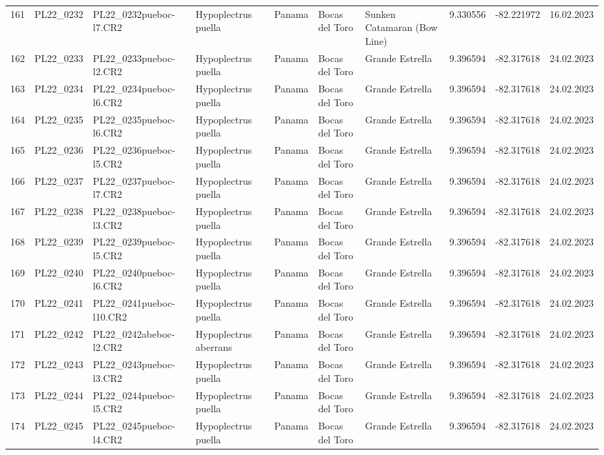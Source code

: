 \begin{table}[ht]
\begin{tabular}{rlllllllll}
  161 & PL22\_0232 & PL22\_0232pueboc-l7.CR2 & Hypoplectrus puella & Panama & Bocas del Toro & Sunken Catamaran (Bow Line) & 9.330556 & -82.221972 & 16.02.2023 \\ 
  162 & PL22\_0233 & PL22\_0233pueboc-l2.CR2 & Hypoplectrus puella & Panama & Bocas del Toro & Grande Estrella & 9.396594 & -82.317618 & 24.02.2023 \\ 
  163 & PL22\_0234 & PL22\_0234pueboc-l6.CR2 & Hypoplectrus puella & Panama & Bocas del Toro & Grande Estrella & 9.396594 & -82.317618 & 24.02.2023 \\ 
  164 & PL22\_0235 & PL22\_0235pueboc-l6.CR2 & Hypoplectrus puella & Panama & Bocas del Toro & Grande Estrella & 9.396594 & -82.317618 & 24.02.2023 \\ 
  165 & PL22\_0236 & PL22\_0236pueboc-l5.CR2 & Hypoplectrus puella & Panama & Bocas del Toro & Grande Estrella & 9.396594 & -82.317618 & 24.02.2023 \\ 
  166 & PL22\_0237 & PL22\_0237pueboc-l7.CR2 & Hypoplectrus puella & Panama & Bocas del Toro & Grande Estrella & 9.396594 & -82.317618 & 24.02.2023 \\ 
  167 & PL22\_0238 & PL22\_0238pueboc-l3.CR2 & Hypoplectrus puella & Panama & Bocas del Toro & Grande Estrella & 9.396594 & -82.317618 & 24.02.2023 \\ 
  168 & PL22\_0239 & PL22\_0239pueboc-l5.CR2 & Hypoplectrus puella & Panama & Bocas del Toro & Grande Estrella & 9.396594 & -82.317618 & 24.02.2023 \\ 
  169 & PL22\_0240 & PL22\_0240pueboc-l6.CR2 & Hypoplectrus puella & Panama & Bocas del Toro & Grande Estrella & 9.396594 & -82.317618 & 24.02.2023 \\ 
  170 & PL22\_0241 & PL22\_0241pueboc-l10.CR2 & Hypoplectrus puella & Panama & Bocas del Toro & Grande Estrella & 9.396594 & -82.317618 & 24.02.2023 \\ 
  171 & PL22\_0242 & PL22\_0242abeboc-l2.CR2 & Hypoplectrus aberrans & Panama & Bocas del Toro & Grande Estrella & 9.396594 & -82.317618 & 24.02.2023 \\ 
  172 & PL22\_0243 & PL22\_0243pueboc-l3.CR2 & Hypoplectrus puella & Panama & Bocas del Toro & Grande Estrella & 9.396594 & -82.317618 & 24.02.2023 \\ 
  173 & PL22\_0244 & PL22\_0244pueboc-l5.CR2 & Hypoplectrus puella & Panama & Bocas del Toro & Grande Estrella & 9.396594 & -82.317618 & 24.02.2023 \\ 
  174 & PL22\_0245 & PL22\_0245pueboc-l4.CR2 & Hypoplectrus puella & Panama & Bocas del Toro & Grande Estrella & 9.396594 & -82.317618 & 24.02.2023 \\ 

\end{tabular}
\end{table}

